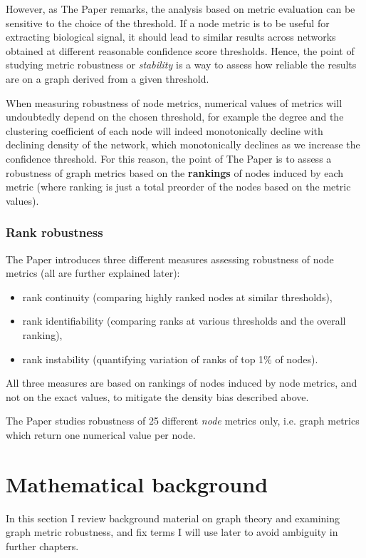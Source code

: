 However, as The Paper remarks, the analysis based on metric evaluation can be sensitive to the choice of the threshold.
If a node metric is to be useful for extracting biological signal, it should lead to similar results across networks obtained at different reasonable confidence score thresholds.
Hence, the point of studying metric robustness or \textsl{stability} is a way to assess how reliable the results are on a graph derived from a given threshold.

When measuring robustness of node metrics, numerical values of metrics will undoubtedly depend on the chosen threshold, for example the degree and the clustering coefficient of each node will indeed monotonically decline with declining density of the network, which monotonically declines as we increase the confidence threshold.
For this reason, the point of The Paper is to assess a robustness of graph metrics based on the \textbf{rankings} of nodes induced by each metric (where ranking is just a total preorder of the nodes based on the metric values).

\subsubsection*{Rank robustness}

The Paper introduces three different measures assessing robustness of node metrics (all are further explained later):
\begin{itemize}
    \item rank continuity (comparing highly ranked nodes at similar thresholds),
    \item rank identifiability (comparing ranks at various thresholds and the overall ranking),
    \item rank instability (quantifying variation of ranks of top 1\% of nodes).
\end{itemize}
All three measures are based on rankings of nodes induced by node metrics, and not on the exact values, to mitigate the density bias described above.

The Paper studies robustness of 25 different \textsl{node} metrics only, i.e. graph metrics which return one numerical value per node.


\section{Mathematical background}\label{sec:math_background}

In this section I review background material on graph theory and examining graph metric robustness, and fix terms I will use later to avoid ambiguity in further chapters.

